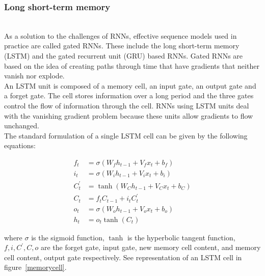 
\subsubsection{Long short-term memory}~\\

As a solution to the challenges of RNNs, effective sequence models used in
practice are called gated RNNs. These include the long short-term memory (LSTM)
and the gated recurrent unit (GRU) based RNNs. Gated RNNs are based on the idea
of creating paths through time that have gradients that neither vanish nor
explode.\\

An LSTM unit is composed of a memory cell, an input gate, an output gate and a
forget gate. The cell stores information over a long period and the three gates
control the flow of information through the cell. RNNs using LSTM units deal
with the vanishing gradient problem because these units allow gradients to flow
unchanged.\cite{doi:10.1162/neco.1997.9.8.1735}\\

The standard formulation of a single LSTM cell can be given by the following
equations:

\begin{align}
  f_t &= \sigma(W_f h_{t-1}+V_f x_t+b_f)\\
  i_t &= \sigma(W_i h_{t-1}+V_i x_t+b_i)\\
  C_t^{'} &= \tanh(W_C h_{t-1}+V_C x_t+b_C)\\
  C_t &= f_t C_{t-1}+i_t C_t^{'}\\
  o_t &= \sigma(W_o h_{t-1}+V_o x_t+b_o)\\
  h_t &= o_t \tanh(C_t)
\end{align}

where $\sigma$ is the sigmoid function, $\tanh$ is the hyperbolic tangent
function, $f,i,C^{'},C,o$ are the forget gate, input gate, new memory cell
content, and memory cell content, output gate respectively. See representation
of an LSTM cell in figure~\ref{memorycell}.


